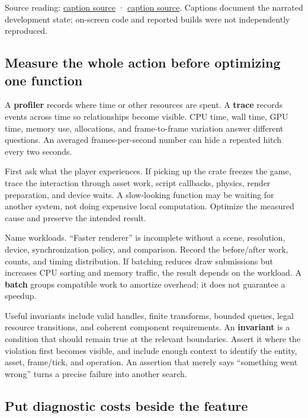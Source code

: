 Source reading: \href{https://www.youtube.com/watch?v=3ZFcvBjRFN0}{caption source} · \href{https://www.youtube.com/watch?v=KanKG-vd9GA}{caption source}. Captions document the narrated development state; on-screen code and reported builds were not independently reproduced.

\subsection{Measure the whole action before optimizing one function}\label{06-engine-ii-ch041-measure-the-whole-action-before-optimizing-one-function}

\hypertarget{06-engine-ii-ch041-measure-the-whole-action-before-optimizing-one-function}{}

A \textbf{profiler} records where time or other resources are spent. A \textbf{trace} records events across time so relationships become visible. CPU time, wall time, GPU time, memory use, allocations, and frame-to-frame variation answer different questions. An averaged frames-per-second number can hide a repeated hitch every two seconds.

First ask what the player experiences. If picking up the crate freezes the game, trace the interaction through asset work, script callbacks, physics, render preparation, and device waits. A slow-looking function may be waiting for another system, not doing expensive local computation. Optimize the measured cause and preserve the intended result.

Name workloads. ``Faster renderer'' is incomplete without a scene, resolution, device, synchronization policy, and comparison. Record the before/after work, counts, and timing distribution. If batching reduces draw submissions but increases CPU sorting and memory traffic, the result depends on the workload. A \textbf{batch} groups compatible work to amortize overhead; it does not guarantee a speedup.

Useful invariants include valid handles, finite transforms, bounded queues, legal resource transitions, and coherent component requirements. An \textbf{invariant} is a condition that should remain true at the relevant boundaries. Assert it where the violation first becomes visible, and include enough context to identify the entity, asset, frame/tick, and operation. An assertion that merely says ``something went wrong'' turns a precise failure into another search.

\subsection{Put diagnostic costs beside the feature}\label{06-engine-ii-ch041-put-diagnostic-costs-beside-the-feature}

